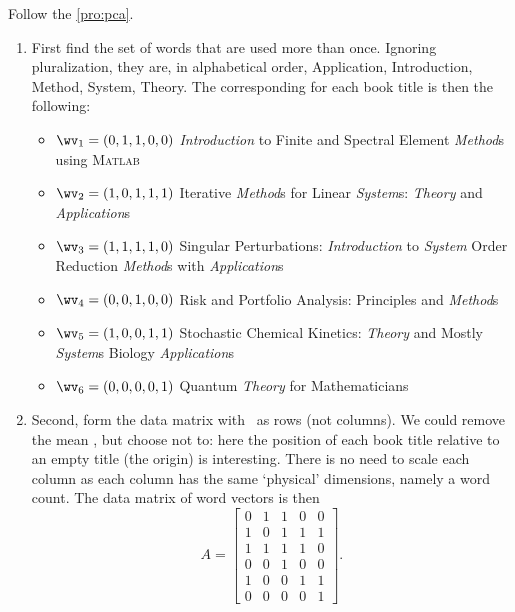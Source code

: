 \begin{reduce}

Follow the  \cref{pro:pca}.
\begin{enumerate}
\item 
First find the set of words that are used more than once.
Ignoring pluralization, they are, in alphabetical order, 
Application, Introduction, Method, System, Theory.
The corresponding  for each book title is then the following:
\begin{itemize}
\item \(\wv_1=(0,1,1,0,0)\) \emph{Introduction} to Finite and Spectral Element \emph{Method}s using \textsc{Matlab}
\item \(\wv_2=(1,0,1,1,1)\) Iterative \emph{Method}s for Linear \emph{System}s: \emph{Theory} and \emph{Application}s 
\item \(\wv_3=(1,1,1,1,0)\) Singular Perturbations: \emph{Introduction} to \emph{System} Order Reduction \emph{Method}s with \emph{Application}s 
\item \(\wv_4=(0,0,1,0,0)\) Risk and Portfolio Analysis: Principles and \emph{Method}s 
\item \(\wv_5=(1,0,0,1,1)\) Stochastic Chemical Kinetics: \emph{Theory} and Mostly \emph{System}s Biology \emph{Application}s
\item \(\wv_6=(0,0,0,0,1)\) Quantum \emph{Theory} for Mathematicians 
\end{itemize}

\item Second, form the data matrix with \hlist{}\ as rows (not columns).
We could remove the mean , but choose not to: here the position of each book title relative to an empty title (the origin) is interesting.
There is no need to scale each column as each column has the same `physical' dimensions, namely a word count.
The data matrix of word vectors is then
\begin{equation*}
A=\begin{bmatrix} 0&1&1&0&0
\\1&0&1&1&1
\\1&1&1&1&0
\\0&0&1&0&0
\\1&0&0&1&1
\\0&0&0&0&1 \end{bmatrix}.
\end{equation*}
\setbox\ajrqrbox\hbox{}%
\marginajrbox%



\end{enumerate}
\end{reduce}
